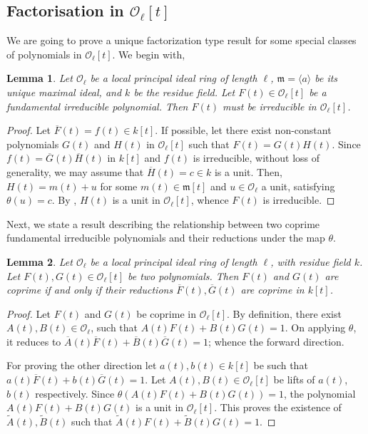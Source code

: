 \documentclass[11pt,twoside]{amsart}
\newtheorem{lemma}{Lemma}[section]
\theoremstyle{definition} %
\begin{document}
\subsection{Factorisation in $\mathscr O_\ell[t]$}
We are going to prove a unique factorization type result for some special classes of polynomials in $\mathscr O_\ell[t]$.
We begin with,
\begin{lemma}\label{lem:f-irred-F-irred}
Let $\mathscr O_\ell$ be a local principal ideal ring of length $\ell$, $\mathfrak{m}= \langle a\rangle$ be its unique maximal ideal, and $k$ be the residue field. Let $F(t)\in \mathscr O_\ell[t]$ be a fundamental irreducible polynomial. Then $F(t)$ must be irreducible in $\mathscr O_\ell[t]$.
\end{lemma}
\begin{proof}
Let $\overline{F}(t)=f(t) \in k[t]$. If possible, let there exist non-constant polynomials $G(t)$ and $H(t)$ in $\mathscr O_\ell[t]$ such that $F(t) = G(t)H(t)$. Since $f(t) = \overline{G}(t) \overline{H}(t)$ in $k[t]$ and $f(t)$ is irreducible, without loss of generality, we may assume that $\overline{H}(t) =c \in k$ is a unit. Then, $H(t) = m(t) + u$ for some $m(t)\in \mathfrak{m}[t]$ and $u\in \mathscr O_\ell$ a unit, satisfying $\theta(u) = c$. By \cite[Theorem 2.2]{ConradNilpotents}, $H(t)$ is a unit in $\mathscr O_\ell[t]$, whence $F(t)$ is irreducible.
\end{proof}
\noindent Next, we state a result describing the relationship between two coprime fundamental irreducible polynomials and their reductions under the map $\theta$.
\begin{lemma}\label{lem:F-G-fund-irred}
Let $\mathscr O_\ell$ be a local principal ideal ring of length $\ell$, with residue field $k$. Let $F(t), G(t)\in\mathscr O_\ell[t]$ be two polynomials. Then $F(t)$ and $G(t)$ are coprime if and only if their reductions $\overline{F}(t), \overline{G}(t)$ are coprime in $k[t]$.
\end{lemma}
\begin{proof}
Let $F(t)$ and $G(t)$ be coprime in $\mathscr O_\ell[t]$. By definition, there exist $A(t), B(t)\in \mathscr O_\ell$, such that $A(t)F(t) + B(t)G(t)=1$. On applying $\theta$, it reduces to $\overline{A}(t) \overline{F}(t) + \overline{B}(t)\overline{G}(t) = 1$; whence the forward direction.

For proving the other direction let $a(t), b(t)\in k[t]$ be such that $a(t)\overline{F}(t) + b(t)\overline{G}(t) =1$. Let $A(t), B(t)\in \mathscr O_\ell[t]$ be lifts of $a(t)$, $b(t)$ respectively. Since $\theta({A(t)F(t) + B(t)G(t)}) = 1$, the polynomial $A(t)F(t) + B(t)G(t)$ is a unit in $\mathscr O_\ell[t]$. This proves the existence of $\widetilde{A}(t), \widetilde{B}(t)$ such that $\widetilde{A}(t) F(t) + \widetilde{B}(t) G(t) = 1$.
\end{proof}
\end{document}
